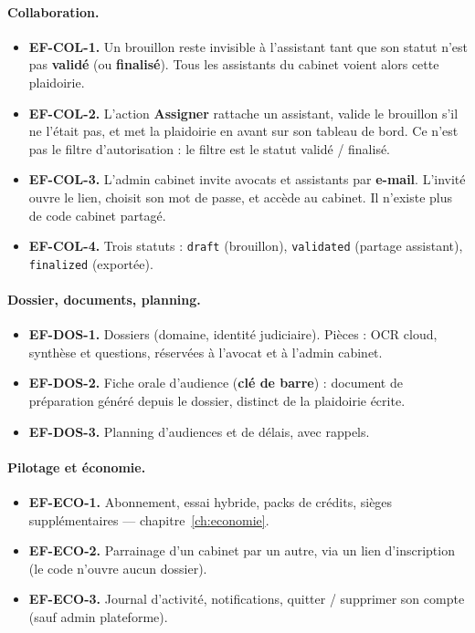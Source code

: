 \paragraph{Collaboration.}
\begin{itemize}[leftmargin=1.4em]
  \item \textbf{EF-COL-1.} Un brouillon reste invisible à l'assistant tant que son statut n'est pas \textbf{validé} (ou \textbf{finalisé}). Tous les assistants du cabinet voient alors cette plaidoirie.
  \item \textbf{EF-COL-2.} L'action \textbf{Assigner} rattache un assistant, valide le brouillon s'il ne l'était pas, et met la plaidoirie en avant sur son tableau de bord. Ce n'est pas le filtre d'autorisation : le filtre est le statut validé / finalisé.
  \item \textbf{EF-COL-3.} L'admin cabinet invite avocats et assistants par \textbf{e-mail}. L'invité ouvre le lien, choisit son mot de passe, et accède au cabinet. Il n'existe plus de code cabinet partagé.
  \item \textbf{EF-COL-4.} Trois statuts : \texttt{draft} (brouillon), \texttt{validated} (partage assistant), \texttt{finalized} (exportée).
\end{itemize}

\paragraph{Dossier, documents, planning.}
\begin{itemize}[leftmargin=1.4em]
  \item \textbf{EF-DOS-1.} Dossiers (domaine, identité judiciaire). Pièces : OCR cloud, synthèse et questions, réservées à l'avocat et à l'admin cabinet.
  \item \textbf{EF-DOS-2.} Fiche orale d'audience (\textbf{clé de barre}) : document de préparation généré depuis le dossier, distinct de la plaidoirie écrite.
  \item \textbf{EF-DOS-3.} Planning d'audiences et de délais, avec rappels.
\end{itemize}

\paragraph{Pilotage et économie.}
\begin{itemize}[leftmargin=1.4em]
  \item \textbf{EF-ECO-1.} Abonnement, essai hybride, packs de crédits, sièges supplémentaires --- chapitre~\ref{ch:economie}.
  \item \textbf{EF-ECO-2.} Parrainage d'un cabinet par un autre, via un lien d'inscription (le code n'ouvre aucun dossier).
  \item \textbf{EF-ECO-3.} Journal d'activité, notifications, quitter / supprimer son compte (sauf admin plateforme).
\end{itemize}

